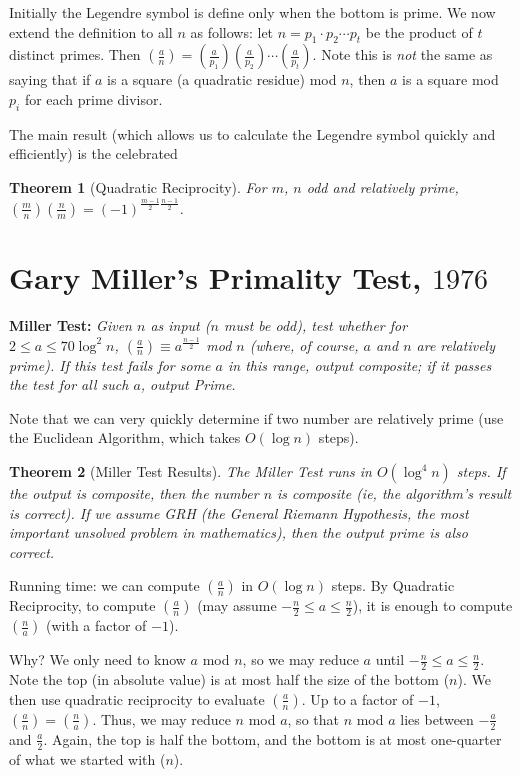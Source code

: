 \documentclass[12pt,letterpaper]{report}
\newcommand\lag[2]{\ensuremath{\left(\frac{#1}{#2}\right)}}
\newtheorem{thm}{Theorem}[section]
\begin{document}
Initially the Legendre symbol is define only when the bottom is
prime. We now extend the definition to all $n$ as follows: let $n
= p_1 \cdot p_2 \cdots p_t$ be the product of $t$ distinct primes.
Then $\lag{a}{n} = \lag{a}{p_1} \lag{a}{p_2} \cdots \lag{a}{p_t}$.
Note this is \emph{not} the same as saying that if $a$ is a square
(a quadratic residue) mod $n$, then $a$ is a square mod $p_i$ for
each prime divisor.

The main result (which allows us to calculate the Legendre symbol
quickly and efficiently) is the celebrated

\begin{thm}[Quadratic Reciprocity] For $m$, $n$ odd and relatively
prime, $\lag{m}{n} \lag{n}{m} =
(-1)^{\frac{m-1}{2}\frac{n-1}{2}}$.
\end{thm}

\section{Gary Miller's Primality Test, $1976$}

\textbf{Miller Test:} \emph{Given $n$ as input ($n$ must be odd),
test whether for $2 \le a \le 70 \log^2 n$, $\lag{a}{n} \equiv
a^{\frac{n-1}{2}}$ mod $n$ (where, of course, $a$ and $n$ are
relatively prime). If this test fails for some $a$ in this range,
output \emph{composite}; if it passes the test for all such $a$,
output \emph{Prime}.}

Note that we can very quickly determine if two number are
relatively prime (use the Euclidean Algorithm, which takes $O(\log
n)$ steps).

\begin{thm}[Miller Test Results]The Miller Test runs in $O(\log^4
n)$ steps. If the output is \emph{composite}, then the number $n$
\emph{is} composite (ie, the algorithm's result is correct). If we
assume GRH (the \emph{General Riemann Hypothesis}, the most
important unsolved problem in mathematics), then the output
\emph{prime} is also correct.
\end{thm}

Running time: we can compute $\lag{a}{n}$ in $O(\log n)$ steps. By
Quadratic Reciprocity, to compute $\lag{a}{n}$ (may assume
$-\frac{n}{2} \le a \le \frac{n}{2}$), it is enough to compute
$\lag{n}{a}$ (with a factor of $-1$).

Why? We only need to know $a$ mod $n$, so we may reduce $a$ until
$-\frac{n}{2} \le a \le \frac{n}{2}$. Note the top (in absolute
value) is at most half the size of the bottom ($n$). We then use
quadratic reciprocity to evaluate $\lag{a}{n}$. Up to a factor of
$-1$, $\lag{a}{n} = \lag{n}{a}$. Thus, we may reduce $n$ mod $a$,
so that $n$ mod $a$ lies between $-\frac{a}{2}$ and $\frac{a}{2}$.
Again, the top is half the bottom, and the bottom is at most
one-quarter of what we started with ($n$).
\end{document}
